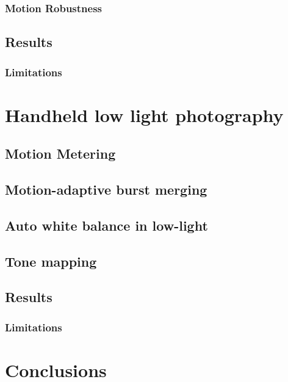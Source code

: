 \documentclass{sig-alternate}
\begin{document}
\subsubsection{Motion Robustness}
\label{sec:robustnessModel}

\subsection{Results}

\subsubsection{Limitations}

\section{Handheld low light photography}



\subsection{Motion Metering}


\subsection{Motion-adaptive burst merging}


\subsection{Auto white balance in low-light}



\subsection{Tone mapping}


\subsection{Results}


\subsubsection{Limitations}

\section{Conclusions}
\end{document}
